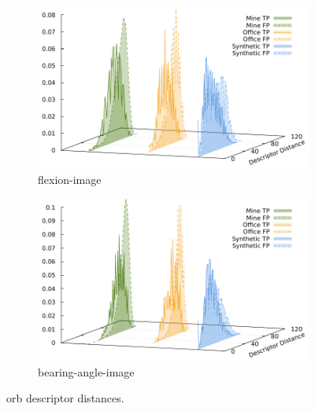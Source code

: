 \begin{figure}[htp]
\begin{subfigure}[t]{0.45\linewidth}
    \includegraphics[width=\linewidth]{chapter06/results/ORB/flexion/descriptor_distances.pdf}%
    \caption{\gls{flexion-image}}
\end{subfigure}\quad
\begin{subfigure}[t]{0.45\linewidth}
    \includegraphics[width=\linewidth]{chapter06/results/ORB/bearing/descriptor_distances.pdf}%
    \caption{\gls{bearing-angle-image}}
\end{subfigure}
    \caption{\acrshort{orb} descriptor distances.}\label{fig:orb_descriptor_distances}
\end{figure}
